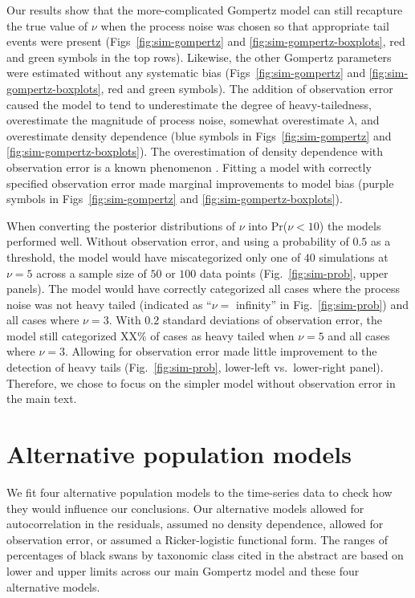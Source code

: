 Our results show that the more-complicated Gompertz model can still recapture
the true value of $\nu$ when the process noise was chosen so that appropriate
tail events were present (Figs~\ref{fig:sim-gompertz} and
\ref{fig:sim-gompertz-boxplots}, red and green symbols in the top rows).
Likewise, the other Gompertz parameters were estimated without any systematic
bias (Figs~\ref{fig:sim-gompertz} and \ref{fig:sim-gompertz-boxplots}, red and
green symbols). The addition of observation error caused the model to tend to
underestimate the degree of heavy-tailedness, overestimate the magnitude of
process noise, somewhat overestimate $\lambda$, and overestimate density
dependence (blue symbols in Figs~\ref{fig:sim-gompertz} and
\ref{fig:sim-gompertz-boxplots}). The overestimation of density dependence with
observation error is a known phenomenon \citep{knape2012}. Fitting a model with
correctly specified observation error made marginal improvements to model bias
(purple symbols in Figs~\ref{fig:sim-gompertz} and
\ref{fig:sim-gompertz-boxplots}).

When converting the posterior distributions of $\nu$ into Pr($\nu < 10$) the
models performed well. Without observation error, and using a probability of
$0.5$ as a threshold, the model would have miscategorized only one of $40$
simulations at $\nu = 5$ across a sample size of $50$ or $100$ data points
(Fig.~\ref{fig:sim-prob}, upper panels). The model would have correctly
categorized all cases where the process noise was not heavy tailed (indicated as
``$\nu =$ infinity'' in Fig.~\ref{fig:sim-prob}) and all cases where $\nu = 3$.
With $0.2$ standard deviations of observation error, the model still categorized
XX\% of cases as heavy tailed when $\nu = 5$ and all cases where $\nu = 3$.
Allowing for observation error made little improvement to the detection of heavy
tails (Fig.~\ref{fig:sim-prob}, lower-left vs.\ lower-right panel). Therefore,
we chose to focus on the simpler model without observation error in the main
text.

\section{Alternative population models}

We fit four alternative population models to the time-series data to check how
they would influence our conclusions. Our alternative models allowed for
autocorrelation in the residuals, assumed no density dependence, allowed for
observation error, or assumed a Ricker-logistic functional form. The ranges of
percentages of black swans by taxonomic class cited in the abstract are based on
lower and upper limits across our main Gompertz model and these four alternative
models.

